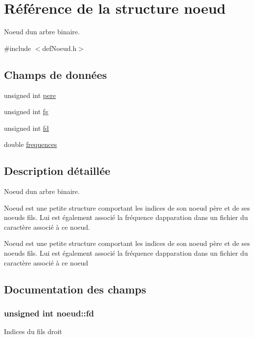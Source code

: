 \hypertarget{structnoeud}{}\section{Référence de la structure noeud}
\label{structnoeud}


Noeud d\textquotesingle{}un arbre binaire.  




{\ttfamily \#include $<$def\+Noeud.\+h$>$}

\subsection*{Champs de données}
\begin{DoxyCompactItemize}
\item 
unsigned int \hyperlink{structnoeud_aa5b03ff1fc332c2390f0324398c0ee1d}{pere}
\item 
unsigned int \hyperlink{structnoeud_ae14c26edcd37240fc9f8e3769d55d3e5}{fg}
\item 
unsigned int \hyperlink{structnoeud_a72ced58e381fdf4144d295884dcd7168}{fd}
\item 
double \hyperlink{structnoeud_a27b27306f715b45b8f8e47bb35ad3859}{frequences}
\end{DoxyCompactItemize}


\subsection{Description détaillée}
Noeud d\textquotesingle{}un arbre binaire. 

Noeud est une petite structure comportant les indices de son noeud père et de ses noeuds fils. Lui est également associé la fréquence d\textquotesingle{}apparation dans un fichier du caractère associé à ce noeud.

Noeud est une petite structure comportant les indices de son noeud père et de ses noeuds fils. Lui est également associé la fréquence d\textquotesingle{}apparation dans un fichier du caractère associé à ce noeud 

\subsection{Documentation des champs}
\subsubsection[{\texorpdfstring{fd}{fd}}]{\setlength{\rightskip}{0pt plus 5cm}unsigned int noeud\+::fd}\hypertarget{structnoeud_a72ced58e381fdf4144d295884dcd7168}{}\label{structnoeud_a72ced58e381fdf4144d295884dcd7168}
Indices du fils droit

